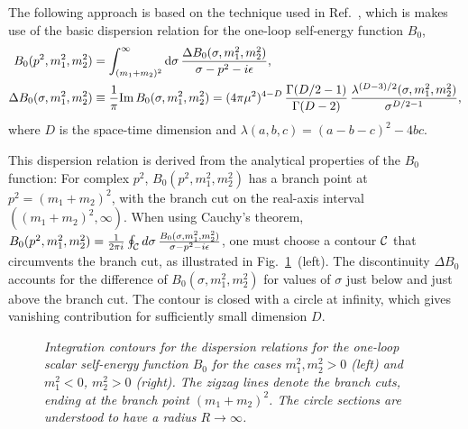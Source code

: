 \documentclass[12pt]{article}
\newcommand{\mycaption}[1]{\caption{\sl #1}}
\begin{document}
The following approach is based on the technique used in
Ref.~\cite{bauberger}, which is makes use of the basic dispersion relation for the
one-loop self-energy function $B_0$, 
\begin{align}
B_0(p^2,m_1^2,m_2^2) &= \int_{(m_1+m_2)^2}^\infty {\rm d}\sigma \,
  \frac{\Delta B_0(\sigma,m_1^2,m_2^2)}{\sigma - p^2-i\epsilon}, \label{b0disp} \\
\Delta B_0(\sigma,m_1^2,m_2^2) &\equiv \frac{1}{\pi} \text{Im} \,
 B_0(\sigma,m_1^2,m_2^2) = (4\pi\mu^2)^{4-D} \,
  \frac{\Gamma(D/2-1)}{\Gamma(D-2)} \, \frac{\lambda^{(D-3)/2}(\sigma,m_1^2,m_2^2)}%
  {\sigma^{D/2-1}},
\end{align}
where $D$ is the space-time dimension and $\lambda(a,b,c) = (a-b-c)^2 - 4bc$.

This dispersion relation is derived from the analytical properties of the $B_0$
function: For complex $p^2$, $B_0(p^2,m_1^2,m_2^2)$ has a branch point at
$p^2=(m_1+m_2)^2$, with the branch cut on the real-axis interval
$((m_1+m_2)^2,\infty)$. When using Cauchy's theorem, $B_0(p^2,m_1^2,m_2^2) =
\frac{1}{2\pi i} \oint_{\cal C} d\sigma \, \frac{B_0(\sigma,m_1^2,m_2^2)}{\sigma -
p^2-i\epsilon}$, one must choose a contour $\cal C$ that circumvents the branch
cut, as illustrated in Fig.~\ref{fig:disp1}~(left).
The discontinuity $\Delta B_0$ accounts for the difference of
$B_0(\sigma,m_1^2,m_2^2)$ for values of $\sigma$ just below and just above the
branch cut. The contour is closed with a circle at infinity, which gives
vanishing contribution for sufficiently small dimension $D$.

\begin{figure}[tb]
\centering
{}
\hspace{1cm}
\mycaption{Integration contours for the dispersion relations for the one-loop
scalar self-energy function $B_0$ for the cases $m_1^2,m_2^2>0$ (left) and
$m_1^2<0$, $m_2^2>0$ (right). The zigzag lines denote the branch cuts, ending at
the branch point $(m_1{+}m_2)^2$. The circle sections are understood to have a radius $R \to \infty$.}
\label{fig:disp1}
\end{figure}
\end{document}
